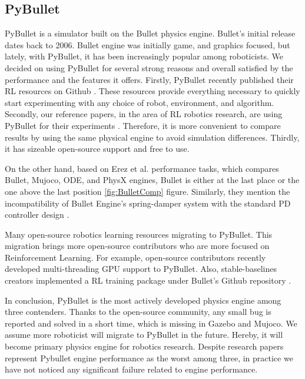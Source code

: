 \subsection{PyBullet}

PyBullet is a simulator built on the Bullet physics engine. Bullet’s initial release dates back to 2006. Bullet engine was initially game, and graphics focused, but lately, with PyBullet, it has been increasingly popular among roboticists. We decided on using PyBullet for several strong reasons and overall satisfied by the performance and the features it offers. Firstly, PyBullet recently published their RL resources on Github \cite{RLBullet}. These resources provide everything necessary to quickly start experimenting with any choice of robot, environment, and algorithm. Secondly, 
our reference papers, in the area of RL robotics research, are using PyBullet for their experiments \cite{Quillen2018} \cite{Breyer2018}. Therefore, it is more convenient to compare results by using the same physical engine to avoid simulation differences. Thirdly, it has sizeable open-source support and free to use. 

On the other hand, based on Erez et al. performance tasks, which compares Bullet, Mujoco, ODE, and PhysX engines, Bullet is either at the last place or the one above the last position \ref{fig:BulletComp} figure. Similarly, they mention the incompatibility of Bullet Engine’s spring-damper system with the standard PD controller design \cite{Erez2015}.

Many open-source robotics learning resources migrating to PyBullet. This migration brings more open-source contributors who are more focused on Reinforcement Learning. For example, open-source contributors recently developed multi-threading GPU support to PyBullet. Also, stable-baselines creators implemented a RL training package under Bullet’s Github repository \cite{StableBullet} \cite{stable-baselines}. 

In conclusion, PyBullet is the most actively developed physics engine among three contenders. Thanks to the open-source community, any small bug is reported and solved in a short time, which is missing in Gazebo and Mujoco. We assume more roboticist will migrate to PyBullet in the future. Hereby, it will become primary physics engine for robotics research. Despite research papers represent Pybullet engine performance as the worst among three, in practice we have not noticed any significant failure related to engine performance.


